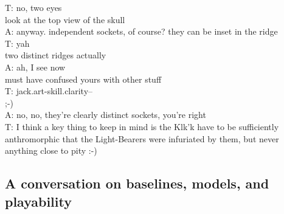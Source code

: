T: no, two eyes\\
look at the top view of the skull\\
A: anyway. independent sockets, of course? they can be inset in the ridge\\
T: yah\\
two distinct ridges actually\\
A: ah, I see now\\
must have confused yours with other stuff\\
T: jack.art-skill.clarity--\\
;-)\\
A: no, no, they're clearly distinct sockets, you're right\\
T: I think a key thing to keep in mind is the Klk'k have to be sufficiently anthromorphic that the Light-Bearers were infuriated by them, but never anything close to pity :-)\\

\subsection{A conversation on baselines, models, and playability}


